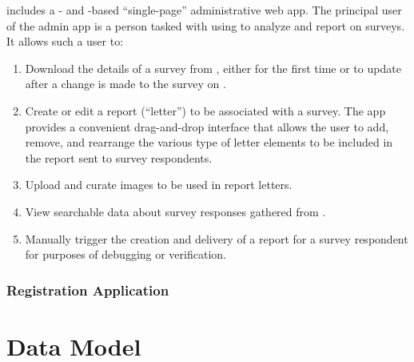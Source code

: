 \documentclass{article}
\begin{document}
\caper{} includes a \vue{}- and \vuetify{}-based
``single-page''
administrative web app.
The principal user of the admin app
is a person tasked with using \caper{}
to analyze and report on \qual{} surveys.
It allows such a user to:
\begin{enumerate}
\item Download the details of a survey from \qual{},
  either for the first time or to update \caper{} after a change is made to the survey on \qual.
\item Create or edit a report (``letter'') to be associated with a survey.
  The app provides a convenient drag-and-drop interface
  that allows the user to add, remove, and rearrange the various type of
  letter elements to be included in the report sent to survey respondents.
\item Upload and curate images to be used in report letters.
\item View searchable data about survey responses gathered from \qual.
\item Manually trigger the creation and delivery of a report for a survey respondent
  for purposes of debugging or verification.
\end{enumerate}


\subsubsection{Registration Application}
\label{sec:group-app}

\section{Data Model}
\label{sec:data-model-overview}
\end{document}
